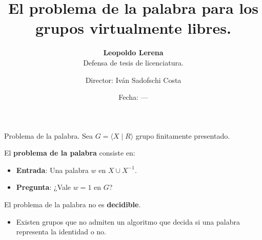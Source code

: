 \documentclass[aspectratio=169, 10pt]{beamer}
\title{El problema de la palabra para los grupos virtualmente libres.}
\subtitle{\textbf{Leopoldo Lerena} \\
		Defensa de tesis de licenciatura.}
\date{Fecha: ---}
\author{Director: Iván Sadofschi Costa}
\institute{Universidad de Buenos Aires}
\begin{document}
	\maketitle

	
	
	
	\begin{frame}[fragile]{Problema de la palabra.}
		Sea $ G = \langle X \mid R \rangle$ grupo finitamente presentado.
		
		\pause 

		El \textbf{problema de la palabra} consiste en:
		\pause 
		\begin{itemize}
					\item 
						\textbf{Entrada}: Una palabra $w$ en $X \cup X^{-1}$.
					\pause 
					\item 
						\textbf{Pregunta}: ¿Vale $w=1$ en $G$?
		\end{itemize}
		\pause 

		El problema de la palabra no es \textbf{decidible}.
		\pause 
		\begin{itemize}
			\item 
				Existen grupos que no admiten un algoritmo que decida si una palabra representa la identidad o no.
		\end{itemize}
		
		
	\end{frame}
\end{document}
